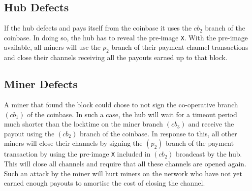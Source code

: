 \documentclass{article}
\begin{document}
\subsection{Hub Defects}\label{ref:hub-defects}

If the hub defects and pays itself from the coinbase it uses the
$cb_2$ branch of the coinbase. In doing so, the hub has to reveal the
pre-image \verb|X|. With the pre-image available, all miners will use
the $p_2$ branch of their payment channel transactions and close their
channels receiving all the payouts earned up to that block.





\subsection{Miner Defects}\label{ref:miner-defects}

A miner that found the block could chose to not sign the co-operative
branch $(cb_1)$ of the coinbase. In such a case, the hub will wait for
a timeout period much shorter than the locktime on the miner branch
$(cb_3)$ and receive the payout using the $(cb_2)$ branch of the
coinbase. In response to this, all other miners will close their
channels by signing the $(p_2)$ branch of the payment transaction by
using the pre-image \verb|X| included in $(cb_2)$ broadcast by the
hub. This will close all channels and require that all these channels
are opened again. Such an attack by the miner will hurt miners on the
network who have not yet earned enough payouts to amortise the cost of
closing the channel.
\end{document}
